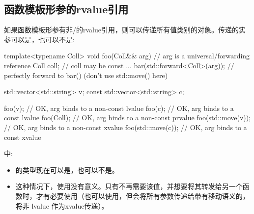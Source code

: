 \subsection{函数模板形参的rvalue引用}

如果函数模板形参有非/的rvalue引用，则可以传递所有值类别的对象。传递的实参可以是，也可以不是:

\begin{cppcode}
template<typename Coll>
void foo(Coll&& arg) // arg is a universal/forwarding reference
{
	Coll coll; // coll may be const
	...
	bar(std::forward<Coll>(arg)); // perfectly forward to bar() (don’t use std::move() here)
}

std::vector<std::string> v;
const std::vector<std::string> c;

foo(v); // OK, arg binds to a non-const lvalue
foo(c); // OK, arg binds to a const lvalue
foo(Coll{}); // OK, arg binds to a non-const prvalue
foo(std::move(v)); // OK, arg binds to a non-const xvalue
foo(std::move(c)); // OK, arg binds to a const xvalue
\end{cppcode}

中:

\begin{itemize}
	\item {}的类型现在可以是，也可以不是。
	\item 这种情况下，使用没有意义。只有不再需要该值，并想要将其转发给另一个函数时，才有必要使用（也可以使用，但会将所有参数传递给带有移动语义的，将非 lvalue 作为xvalue传递）。
\end{itemize}












